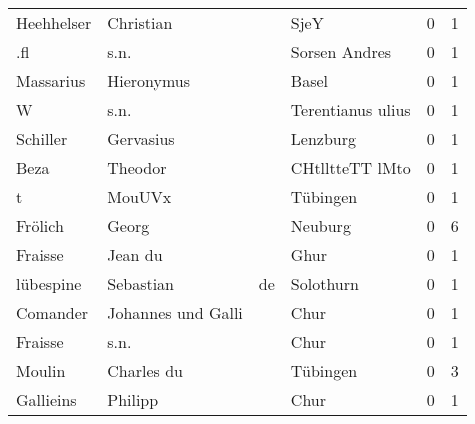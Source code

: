 \begin{tabular}{llllrr}
               Heehhelser &                          Christian &             &                                        SjeY &          0 &         1 \\
                      .fl &                               s.n. &             &                               Sorsen Andres &          0 &         1 \\
                Massarius &                         Hieronymus &             &                                       Basel &          0 &         1 \\
                        W &                               s.n. &             &                           Terentianus ulius &          0 &         1 \\
                 Schiller &                          Gervasius &             &                                    Lenzburg &          0 &         1 \\
                     Beza &                            Theodor &             &                             CHtlltteTT lMto &          0 &         1 \\
                        t &                             MouUVx &             &                                    Tübingen &          0 &         1 \\
                  Frölich &                              Georg &             &                                     Neuburg &          0 &         6 \\
                  Fraisse &                            Jean du &             &                                        Ghur &          0 &         1 \\
                lübespine &                          Sebastian &          de &                                   Solothurn &          0 &         1 \\
                 Comander &                 Johannes und Galli &             &                                        Chur &          0 &         1 \\
                  Fraisse &                               s.n. &             &                                        Chur &          0 &         1 \\
                   Moulin &                         Charles du &             &                                    Tübingen &          0 &         3 \\
                Gallieins &                            Philipp &             &                                        Chur &          0 &         1 \\

\end{tabular}
